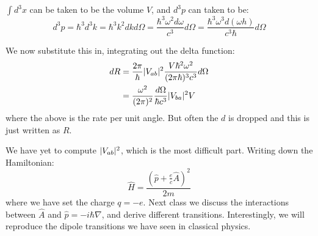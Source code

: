 $\int d^3x$ can be taken to be the volume $V$, and $d^3p$ can taken to be:
\begin{equation}
    d^3p = \hbar^3 d^3k = \hbar^3 k^2 dk d\Omega = \frac{\hbar^3 \omega^2d\omega}{c^3} d\Omega = \frac{\hbar^3\omega^3d(\omega h)}{c^3\hbar}d\Omega
\end{equation}

We now substitute this in, integrating out the delta function:
\begin{equation}
    \begin{split}
        dR &= \frac{2\pi}{\hbar}\lvert V_{ab} \rvert^2 \frac{V\hbar^2\omega^2}{(2\pi\hbar)^3c^3}d\Omega 
        \\ &= \frac{\omega^2}{(2\pi)^2}\frac{d\Omega}{\hbar c^3}\lvert V_{ba} \rvert^2 V
    \end{split}
\end{equation}
where the above is the rate per unit angle. But often the $d$ is dropped and this is just written as $R$.

We have yet to compute $\lvert V_{ab} \rvert^2$, which is the most difficult part. Writing down the Hamiltonian:
\begin{equation}
    \hat{H} = \frac{\left(\hat{p} + \frac{e}{c}\hat{A}\right)^2}{2m}
\end{equation}
where we have set the charge $q = -e$. Next class we discuss the interactions between $\hat{A}$ and $\hat{p} = -i\hbar \nabla$, and derive different transitions. Interestingly, we will reproduce the dipole transitions we have seen in classical physics. 